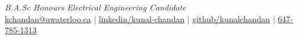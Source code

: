 \documentclass[]{chandan-cv}
\begin{document}
%
%

%
%
{
	\textit{B.A.Sc Honours Electrical Engineering Candidate} \\
	\href{mailto:kchandan@uwaterloo.ca}{kchandan@uwaterloo.ca} \quad
	| \quad
	\href{https://www.linkedin.com/in/kunal-chandan/}{linkedin/kunal-chandan} \quad
	| \quad
	\href{http://github.com/kunalchandan}{github/kunalchandan} \quad
	| \quad
	\href{tel:6477851313}{647-785-1313}
}

%
%
\end{document}
